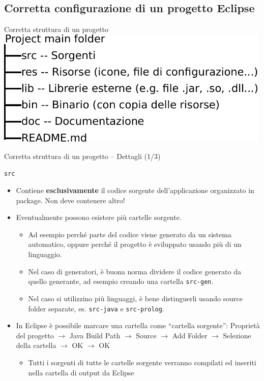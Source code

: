 \documentclass[presentation]{beamer}
\begin{document}
\subsection{Corretta configurazione di un progetto Eclipse}

\begin{frame}{Corretta struttura di un progetto}
\centering
\includegraphics[width=0.99\textwidth]{img/struct}
\end{frame}

\begin{frame}{Corretta struttura di un progetto -- Dettagli (1/3)}

\begin{block}{\texttt{src}}
\begin{itemize}
\item Contiene \textbf{esclusivamente} il codice sorgente dell'applicazione organizzato in package. Non deve contenere altro!

\item Eventualmente possono esistere più cartelle sorgente.
\begin{itemize}
\item Ad esempio perché parte del codice viene generato da un sistema automatico, oppure perché il progetto è sviluppato usando più di un linguaggio.
\item Nel caso di generatori, è buona norma dividere il codice generato da quello generante, ad esempio creando una cartella \texttt{src-gen}.
\item Nel caso si utilizzino più linguaggi, è bene distinguerli usando source folder separate, es. \texttt{src-java} e \texttt{src-prolog}.
\end{itemize} 

\item In Eclipse è possibile marcare una cartella come ``cartella sorgente'': Proprietà del progetto $\rightarrow$ Java Build Path $\rightarrow$ Source $\rightarrow$ Add Folder $\rightarrow$ Selezione della cartella $\rightarrow$ OK $\rightarrow$ OK
\begin{itemize}
\item Tutti i sorgenti di tutte le cartelle sorgente verranno compilati ed inseriti nella cartella di output da Eclipse
\end{itemize}		
\end{itemize}
\end{block}
\end{frame}
\end{document}
